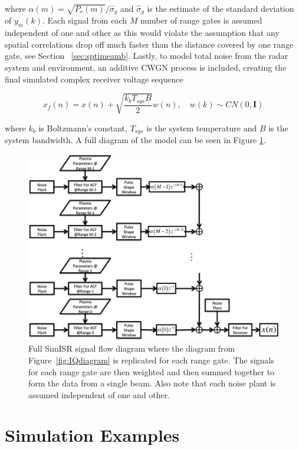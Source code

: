\noindent where $\alpha(m) = \sqrt{P_r(m)}/\widehat{\sigma}_y$ and $\widehat{\sigma}_y$ is the estimate of the standard deviation of $y_m(k)$. Each signal from each $M$ number of range gates is assumed independent of one and other as this would violate the assumption that any spatial correlations drop off much faster than the distance covered by one range gate, see Section ~\ref{sec:sptimeamb}. Lastly, to model total noise from the radar system and environment, an additive CWGN process is included, creating the final simulated complex receiver voltage sequence

\begin{equation}
\label{eq:addnoise}
x_f(n) = x(n) +\sqrt{\frac{k_bT_{sys}B}{2}} w(n), \quad w(k)\sim CN(0,\mathbf{I})
\end{equation}

\noindent where $k_b$ is Boltzmann's constant, $T_{sys}$ is the system temperature and $B$ is the system bandwidth.
A full diagram of the model can be seen in Figure \ref{fig:isrdiag}.

\begin{figure}[!h]
\centering
\includegraphics[width=5.5in]{diagram}
\caption{Full SimISR signal flow diagram where the diagram from Figure~\ref{fig:IQdiagram} is replicated for each range gate. The signals for each range gate are then weighted and then summed together to form the data from a single beam. Also note that each noise plant is assumed independent of one and other.}
\label{fig:isrdiag}
\end{figure}

\section{Simulation Examples}
\label{sec:simex}

